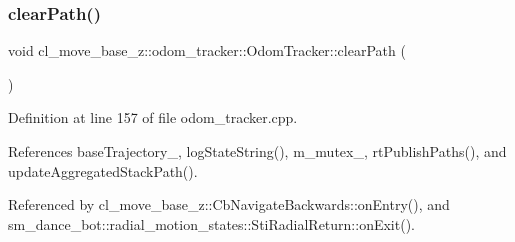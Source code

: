 \subsubsection{\texorpdfstring{clear\+Path()}{clearPath()}}
{\footnotesize\ttfamily void cl\+\_\+move\+\_\+base\+\_\+z\+::odom\+\_\+tracker\+::\+Odom\+Tracker\+::clear\+Path (\begin{DoxyParamCaption}{ }\end{DoxyParamCaption})}



Definition at line 157 of file odom\+\_\+tracker.\+cpp.



References base\+Trajectory\+\_\+, log\+State\+String(), m\+\_\+mutex\+\_\+, rt\+Publish\+Paths(), and update\+Aggregated\+Stack\+Path().



Referenced by cl\+\_\+move\+\_\+base\+\_\+z\+::\+Cb\+Navigate\+Backwards\+::on\+Entry(), and sm\+\_\+dance\+\_\+bot\+::radial\+\_\+motion\+\_\+states\+::\+Sti\+Radial\+Return\+::on\+Exit().


